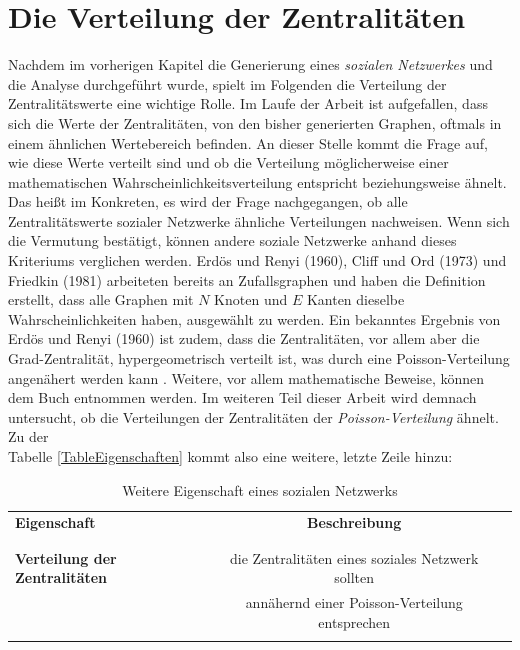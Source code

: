 \newpage
\section{Die Verteilung der Zentralitäten}
Nachdem im vorherigen Kapitel die Generierung eines \textit{sozialen Netzwerkes} und die Analyse durchgeführt wurde, spielt im Folgenden die Verteilung der Zentralitätswerte eine wichtige Rolle.
Im Laufe der Arbeit ist aufgefallen, dass sich die Werte der Zentralitäten, von den bisher generierten Graphen, oftmals in einem ähnlichen Wertebereich befinden. An dieser Stelle kommt die Frage auf, wie diese Werte verteilt sind und ob die Verteilung möglicherweise einer mathematischen Wahrscheinlichkeitsverteilung entspricht beziehungsweise ähnelt. Das heißt im Konkreten, es wird der Frage nachgegangen, ob alle Zentralitätswerte sozialer Netzwerke ähnliche Verteilungen nachweisen. Wenn sich die Vermutung bestätigt, können andere soziale Netzwerke anhand dieses Kriteriums verglichen werden.
Erdös und Renyi (1960), Cliff und Ord (1973) und Friedkin (1981) arbeiteten bereits an Zufallsgraphen und haben die Definition erstellt, dass alle Graphen mit $N$ Knoten und $E$ Kanten dieselbe Wahrscheinlichkeiten haben, ausgewählt zu werden. Ein bekanntes Ergebnis von Erdös und Renyi (1960) ist zudem, dass die Zentralitäten, vor allem aber die Grad-Zentralität, hypergeometrisch verteilt ist, was durch eine Poisson-Verteilung angenähert werden kann \cite{Distribution}. Weitere, vor allem mathematische Beweise, können dem Buch \cite{Distribution} entnommen werden. Im weiteren Teil dieser Arbeit wird demnach untersucht, ob die Verteilungen der Zentralitäten der \textit{Poisson-Verteilung} ähnelt. Zu der \\ Tabelle \ref{TableEigenschaften} kommt also eine weitere, letzte Zeile hinzu:

\begin{table}[h!]
\footnotesize
\caption{Weitere Eigenschaft eines sozialen Netzwerks}
\label{TableEigenschaften2.0}
\centering
\begin{tabular}{lcc}\toprule 
\textbf{Eigenschaft} &\textbf{Beschreibung} \\
 &\\\midrule
 \\
  \textbf{Verteilung der Zentralitäten} & die Zentralitäten eines soziales Netzwerk sollten \\ &annähernd einer Poisson-Verteilung entsprechen \cite{verteilung} \\
  \\\bottomrule
 \end{tabular}
 \end{table}

